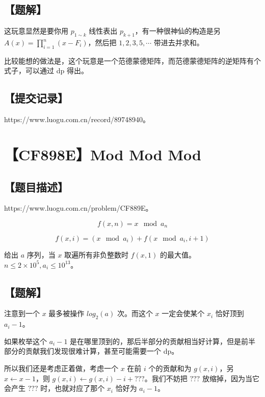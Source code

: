 \documentclass[UTF8,12pt,a4paper]{ctexart}
\begin{document}
	\subsection*{【题解】}
	
	这玩意显然是要你用 $p_{1\sim k}$ 线性表出 $p_{k+1}$，有一种很神仙的构造是另 $A(x)=\prod_{i=1}^n(x-F_i)$，然后把 $1,2,3,5,\cdots$ 带进去并求和。
	
	比较能想的做法是，这个玩意是一个范德蒙德矩阵，而范德蒙德矩阵的逆矩阵有个式子，可以通过 dp 得出。
	
	\subsection*{【提交记录】}
	
	https://www.luogu.com.cn/record/89748940。
	
	
	\section*{【CF898E】Mod Mod Mod}
	
	\subsection*{【题目描述】}
	
	https://www.luogu.com.cn/problem/CF889E。
	
	$$f(x,n) = x \mod a_n$$
	
	$$f(x,i) = ( x \mod a_i ) + f(x \mod a_i,i+1)$$
	
	给出 $a$ 序列，当 $x$ 取遍所有非负整数时 $f(x,1)$ 的最大值。$n\le 2\times 10^5, a_i\le 10^{13}$。
	
	\subsection*{【题解】}
	
	注意到一个 $x$ 最多被操作 $log_2(a)$ 次。而这个 $x$ 一定会使某个 $x_i$ 恰好顶到 $a_i-1$。
	
	如果枚举这个 $a_i-1$ 是在哪里顶到的，那后半部分的贡献相当好计算，但是前半部分的贡献我们发现很难计算，甚至可能需要一个 dp。
	
	所以我们还是考虑正着做，考虑一个 $x$ 在前 $i$ 个的贡献和为 $g(x,i)$，另 $x\leftarrow x-1$，则 $g(x,i)\leftarrow g(x,i)-i+???$。我们不妨把 $???$ 放缩掉，因为当它会产生 $???$ 时，也就对应了那个 $x_i$ 恰好为 $a_i-1$。
	
\end{document}
